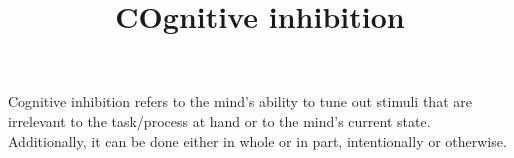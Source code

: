 \documentclass[a4paper]{article}
\title{COgnitive inhibition}
\date{}
\begin{document}
\maketitle
    Cognitive inhibition refers to the mind's ability to tune out stimuli that are irrelevant to the task/process at hand or to the mind's current state. Additionally, it can be done either in whole or in part, intentionally or otherwise. 
\end{document}

